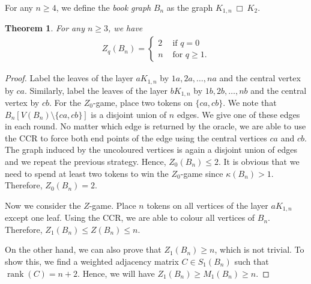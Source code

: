 \documentclass[3p,times,12pt]{article}
\newtheorem{theorem}{Theorem}[section]
\newcommand{\sqr}{\: \Box\:  }
\begin{document}
	For any $n\geq 4$, we define the {\em book graph} $B_n$  as the graph $K_{1,n} \sqr K_2$.
	\begin{theorem}\label{book}
		For any $n\geq 3$, we have
		\begin{align*}
			Z_q(B_n) = \left\{
			\begin{aligned}
				2 & \mbox{ if } q = 0\\
				n & \mbox{ for }q \geq 1.
			\end{aligned}
			\right. 
		\end{align*}
	\end{theorem}
	\begin{proof}
		Label the leaves of the layer $aK_{1,n}$ by $1a,2a,\ldots,na$ and the central vertex by $ca$. Similarly, label the leaves of the layer $bK_{1,n}$ by $1b,2b,\ldots,nb$ and the central vertex by $cb$. For the $Z_0$-game, place two tokens on $\{ca,cb\}$. We note that $B_n[V(B_n)\setminus \{ca,cb\}]$ is a disjoint union of $n$ edges. We give one of these edges in each round. No matter which edge is returned by the oracle, we are able to use the CCR to force both end points of the edge using the central vertices $ca$ and $cb$. The graph induced by the uncoloured vertices is again a disjoint union of edges and we repeat the previous strategy.  Hence, $Z_0(B_n) \leq 2$. It is obvious that we  need to spend at least two tokens to win the $Z_0$-game since $\kappa(B_n)>1$. Therefore, $Z_0(B_n) = 2$.
		
		Now we consider the $Z$-game. Place $n$ tokens on all vertices of the layer $aK_{1,n}$ except one leaf. Using the CCR, we are able to colour all vertices of $B_n$. Therefore, $Z_1(B_n) \leq Z(B_n)\leq n$.
		
		On the other hand, we can also prove that $Z_1(B_n) \geq n$, which is not trivial. To show this, we find a weighted adjacency matrix $C\in S_1(B_n)$ such that $\operatorname{rank}(C) = n+2$. Hence, we will have $Z_1(B_n) \geq M_1(B_n) \geq n$. 
		

\end{proof}
\end{document}
